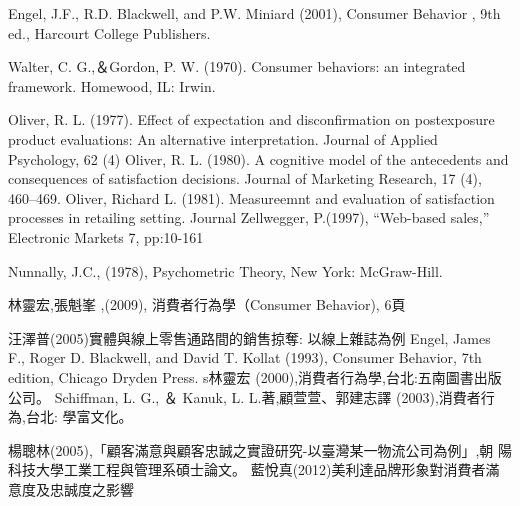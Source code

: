 \documentclass[a4paper,12pt]{report}
\begin{document}
\begin{thebibliography}{1}
Engel, J.F., R.D. Blackwell, and P.W. Miniard (2001), Consumer Behavior , 9th
ed., Harcourt College Publishers.

Walter, C. G.,＆Gordon, P. W. (1970). Consumer behaviors: an integrated framework. Homewood, IL: Irwin.

Oliver, R. L. (1977). Effect of expectation and disconfirmation on postexposure product
evaluations: An alternative interpretation. Journal of Applied Psychology, 62 (4)
Oliver, R. L. (1980). A cognitive model of the antecedents and consequences of satisfaction
decisions. Journal of Marketing Research, 17 (4), 460–469.
Oliver, Richard L. (1981). Measureemnt and evaluation of satisfaction processes in retailing setting. Journal
Zellwegger, P.(1997), “Web-based sales,” Electronic Markets 7, pp:10-161


Nunnally, J.C., (1978), Psychometric Theory, New York: McGraw-Hill. 

林靈宏,張魁峯 ,(2009), 消費者行為學（Consumer Behavior), 6頁

汪澤普(2005)實體與線上零售通路間的銷售掠奪: 以線上雜誌為例
Engel, James F., Roger D. Blackwell, and David T. Kollat (1993), Consumer
Behavior, 7th edition, Chicago Dryden Press.
s林靈宏 (2000),消費者行為學,台北:五南圖書出版公司。
Schiffman, L. G.,  ＆ Kanuk, L. L.著,顧萱萱、郭建志譯 (2003),消費者行為,台北: 學富文化。

楊聰林(2005),「顧客滿意與顧客忠誠之實證研究-以臺灣某一物流公司為例」,朝
  陽科技大學工業工程與管理系碩士論文。
藍悅真(2012)美利達品牌形象對消費者滿意度及忠誠度之影響
\end{thebibliography}
\clearpage
\end{document}
